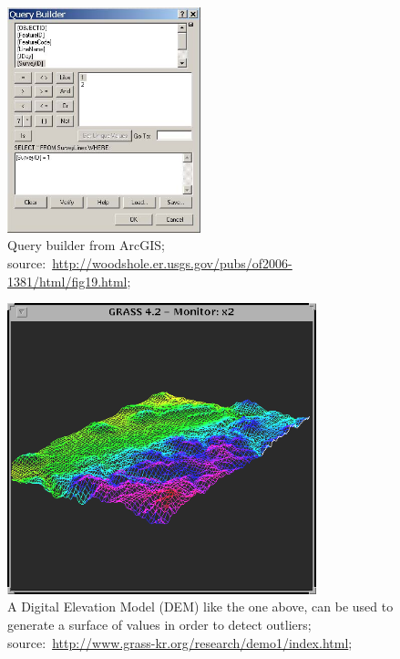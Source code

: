 \documentclass[11pt]{article} %
\begin{document}
  \begin{figure}[!ht]%
    \begin{center} 
	\includegraphics[width=0.5\textwidth ]{builder.jpg}
      \caption[Query builder from ArcGIS;]
{Query builder from ArcGIS; source:~\url{http://woodshole.er.usgs.gov/pubs/of2006-1381/html/fig19.html};}
      \label{builder} %
    \end{center} 
  \end{figure}

  \begin{figure}[!ht]%
    \begin{center} 
	\includegraphics[width=0.8\textwidth ]{dem.png}
      \caption[A Digital Elevation Model (DEM) like the one above, can be used to generate a surface of values in order to detect outliers;]
{A Digital Elevation Model (DEM) like the one above, can be used to generate a surface of values in order to detect outliers; source:~\url{http://www.grass-kr.org/research/demo1/index.html};}
      \label{dem} %
    \end{center} 
  \end{figure}
\end{document}
